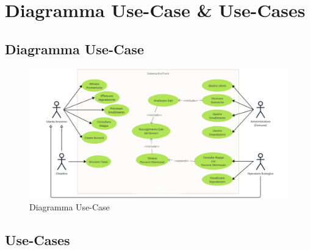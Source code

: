 \section{Diagramma Use-Case \& Use-Cases}

    \subsection{Diagramma Use-Case}

        \begin{figure} [H]
            \centering
            \includegraphics[width=1\linewidth]{D1-G1//Img/Use-Case Diagram - D1.png}
            \caption{Diagramma Use-Case}
            \label{fig:enter-label}
        \end{figure}

    \subsection{Use-Cases}

